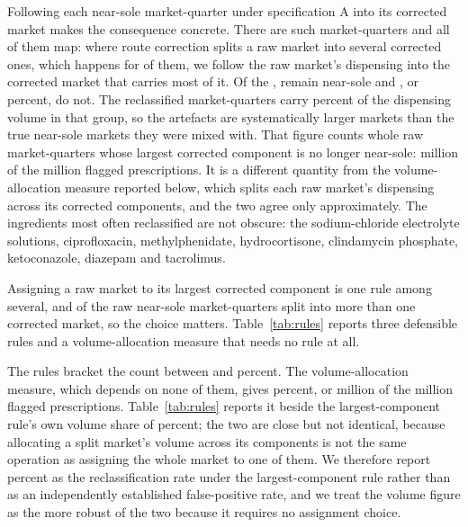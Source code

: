 \documentclass[pdflatex,sn-vancouver-num,Numbered]{sn-jnl}
\begin{document}
Following each near-sole market-quarter under specification A into its corrected market makes the
consequence concrete. There are \nNearSoleMQ such market-quarters and all of them map: where route
correction splits a raw market into several corrected ones, which happens for \nSplitMarkets of them,
we follow the raw market's dispensing into the corrected market that carries most of it. Of the
\nNearSoleMQ, \nRetained remain near-sole and \nReclassified, or \nReclassRate percent, do not. The reclassified
market-quarters carry \nReclassVolLargest percent of the dispensing volume in that group, so the
artefacts are systematically larger markets than the true near-sole markets they were mixed with.
That figure counts whole raw market-quarters whose largest corrected component is no longer
near-sole: \nLargestRxReclass million of the \nFlaggedRx million flagged prescriptions. It is a
different quantity from the volume-allocation measure reported below, which splits each raw
market's dispensing across its corrected components, and the two agree only approximately. The ingredients most often reclassified are not obscure:
the sodium-chloride electrolyte solutions, ciprofloxacin, methylphenidate, hydrocortisone,
clindamycin phosphate, ketoconazole, diazepam and tacrolimus.

Assigning a raw market to its largest corrected component is one rule among several, and \nSplitMarkets
of the \nNearSoleMQ raw near-sole market-quarters split into more than one corrected market, so the
choice matters. Table~\ref{tab:rules} reports three defensible rules and a volume-allocation
measure that needs no rule at all.

\begin{table}[htbp]
\small
\caption{Share of raw near-sole market-quarters whose alert is withdrawn, under three mapping
rules. Each row states the condition under which a raw near-sole alert is withdrawn, which is
what the count reports: the three rules differ only in how a raw market that splits into several
corrected markets is resolved, so they bracket the headline figure rather than compete with it.
The volume measure allocates each raw market's dispensing across all of its corrected components
and needs no rule.}\label{tab:rules}

\end{table}

The rules bracket the count between \nReclassLow and \nReclassHigh percent. The volume-allocation
measure, which depends on none of them, gives \nReclassVol percent, or \nAllocRxReclass million of
the \nFlaggedRx million flagged prescriptions. Table~\ref{tab:rules} reports it beside the
largest-component rule's own volume share of \nReclassVolLargest percent; the two are close but
not identical, because allocating a split market's volume across its components is not the same
operation as assigning the whole market to one of them. We therefore report \nReclassRate percent as the reclassification
rate under the largest-component rule rather than as an independently established false-positive
rate, and we treat the volume figure as the more robust of the two because it requires no
assignment choice.
\end{document}
